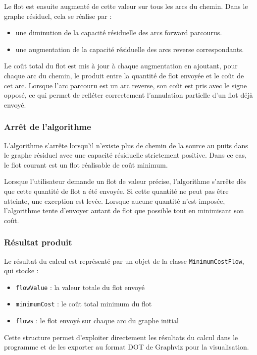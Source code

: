 \documentclass[titlepage]{article}
\begin{document}
Le flot est ensuite augmenté de cette valeur sur tous les arcs du chemin. Dans le graphe résiduel, cela se réalise par :
\begin{itemize}
    \item une diminution de la capacité résiduelle des arcs forward parcourus.
    \item une augmentation de la capacité résiduelle des arcs reverse correspondants.
\end{itemize}

Le coût total du flot est mis à jour à chaque augmentation en ajoutant, pour chaque arc du chemin, le produit entre la quantité de flot envoyée et le coût de cet arc. Lorsque l'arc parcouru est un arc reverse, son coût est pris avec le signe opposé, ce qui permet de refléter correctement l'annulation partielle d'un flot déjà envoyé.

\subsubsection{Arrêt de l'algorithme}

L'algorithme s'arrête lorsqu'il n'existe plus de chemin de la source au puits dans le graphe résiduel avec une capacité résiduelle strictement positive. Dans ce cas, le flot courant est un flot réalisable de coût minimum.

Lorsque l'utilisateur demande un flot de valeur précise, l'algorithme s'arrête dès que cette quantité de flot a été envoyée. Si cette quantité ne peut pas être atteinte, une exception est levée. Lorsque aucune quantité n'est imposée, l'algorithme tente d'envoyer autant de flot que possible tout en minimisant son coût.

\subsubsection{Résultat produit}

Le résultat du calcul est représenté par un objet de la classe \texttt{MinimumCostFlow}, qui stocke :
\begin{itemize}
    \item \texttt{flowValue} : la valeur totale du flot envoyé
    \item \texttt{minimumCost} : le coût total minimum du flot
    \item \texttt{flows} : le flot envoyé sur chaque arc du graphe initial
\end{itemize}

Cette structure permet d'exploiter directement les résultats du calcul dans le programme et de les exporter au format DOT de Graphviz pour la visualisation.
\end{document}
